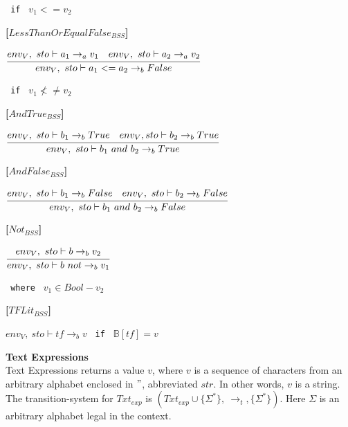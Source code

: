 {\begin{center}
	\texttt{ if } $v_1 <= v_2$
\end{center}

\textbf{[$LessThanOrEqualFalse_{BSS}$]}\\
\begin{center}
	\begin{math}
	\cfrac
	{env_V,\ sto \vdash a_1 \rightarrow_a v_1 \quad env_V,\ sto \vdash a_2 \rightarrow_a v_2}
	{env_V,\ sto \vdash a_1 <= a_2 \rightarrow_b False}
	\end{math}
	
	\texttt{ if } $v_1 \not<\not= v_2$
\end{center}

\textbf{[$AndTrue_{BSS}$]}\\
\begin{center}
	\begin{math}
	\cfrac
		{env_V,\ sto \vdash b_1 \rightarrow_b True \quad env_V, sto \vdash b_2 \rightarrow_b True}
		{env_V,\ sto \vdash b_1\ and\ b_2 \rightarrow_b True}
	\end{math}
\end{center}

\textbf{[$AndFalse_{BSS}$]}\\
\begin{center}
	\begin{math}
	\cfrac
		{env_V,\ sto \vdash b_1 \rightarrow_b False \quad env_V,\ sto \vdash b_2 \rightarrow_b False}
		{env_V,\ sto \vdash b_1\ and\ b_2 \rightarrow_b False}
	\end{math}
\end{center}

\textbf{[$Not_{BSS}$]}\\
\begin{center}
	\begin{math}
	\cfrac
	{env_V,\ sto \vdash b \rightarrow_b v_2}
	{env_V,\ sto \vdash b\ not \rightarrow_b v_1}
	\end{math}
	
	\texttt{ where } $v_1 \in Bool - v_2$
\end{center}

\textbf{[$TFLit_{BSS}$]}\\
\begin{center}
	\begin{math}
	env_V,\ sto \vdash tf \rightarrow_b v
	\end{math}
	\texttt{ if } $\mathbb{B}[tf] = v$
\end{center}

\textbf{\large{Text Expressions}}\\
Text Expressions returns a value $v$, where $v$ is a sequence of characters from an arbitrary alphabet enclosed in $"$, abbreviated $str$.
In other words, $v$ is a string.
The transition-system for $Txt_{exp}$ is $(Txt_{exp} \cup \{\Sigma^*\},\ \rightarrow_t, \{\Sigma^*\})$.
Here $\Sigma$ is an arbitrary alphabet legal in the context.

}
